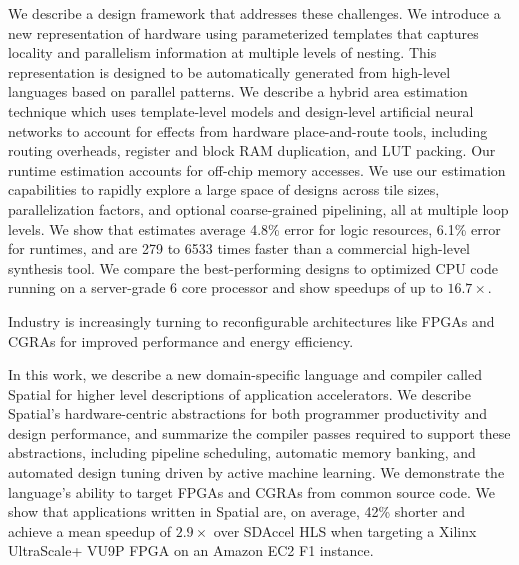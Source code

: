 We describe a design framework that addresses these challenges. We
introduce a new representation of hardware using parameterized
templates that captures locality and parallelism information at
multiple levels of nesting. This representation is designed to be
automatically generated from high-level languages based on parallel
patterns. We describe a hybrid area estimation
technique which uses template-level models and design-level artificial neural networks
to account for effects from hardware
place-and-route tools, including routing overheads, register and block RAM
duplication, and LUT packing. Our runtime estimation accounts for
off-chip memory accesses.  We use our estimation capabilities to
rapidly explore a large space of designs across tile sizes,
parallelization factors, and optional coarse-grained pipelining, all
at multiple loop levels. We show that estimates average 4.8\% error for
logic resources, 6.1\% error for runtimes, and are 279 to 6533 times faster
than a commercial high-level synthesis tool. We compare the
best-performing designs to optimized CPU code running on a
server-grade 6 core processor and show speedups of up to $16.7\times$.


Industry is increasingly turning to reconfigurable architectures like FPGAs and CGRAs for improved performance and energy
efficiency.


In this work, we describe a new domain-specific language and compiler called Spatial for higher level descriptions of application accelerators.
We describe Spatial's hardware-centric abstractions for both programmer productivity and design performance, and summarize the compiler passes required to support these abstractions, including pipeline scheduling, automatic memory banking, and automated design tuning driven by active machine learning.
We demonstrate the language's ability to target FPGAs and CGRAs from common source code. We show that applications written in Spatial
are, on average, 42\% shorter and achieve a mean speedup of $2.9\times$ over SDAccel HLS when targeting a Xilinx UltraScale+ VU9P FPGA on an Amazon EC2 F1 instance.
